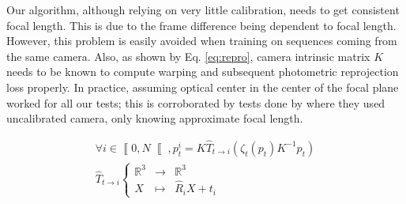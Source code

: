 \documentclass[runningheads]{llncs}
\begin{document}
Our algorithm, although relying on very little calibration, needs to get consistent focal length. This is due to the frame difference being dependent to focal length. However, this problem is easily avoided when training on sequences coming from the same camera. Also, as shown by Eq. \ref{eq:repro}, camera 
intrinsic matrix $K$ needs
to be known to compute warping and subsequent photometric reprojection loss properly. In practice, assuming optical center in the center of the focal plane worked for all our tests; this is corroborated by tests done by \cite{Mahjourian} where they used uncalibrated camera, only knowing approximate focal length.

\begin{equation}
\label{eq:repro}
\begin{array}{c}
\forall i \in \left\llbracket0,N\right\llbracket,p^i_t=K\widehat{T}_{t \rightarrow i}\left(\zeta_t(p_t)K^{-1}p_t\right) \\
\widehat{T}_{t \rightarrow i} \left\lbrace 
\begin{array}{lll}\mathbb{R}^3 & \rightarrow & \mathbb{R}^3 \\
X & \mapsto & \widehat{R}_{i}X + t_{i}
\end{array}\right.
\end{array}
\end{equation}
\end{document}
